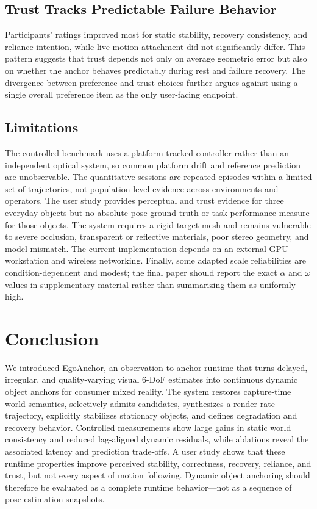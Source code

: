 \documentclass[review]{vgtc}
\newcommand{\system}{EgoAnchor}
\begin{document}
\subsection{Trust Tracks Predictable Failure Behavior}
Participants' ratings improved most for static stability, recovery consistency, and reliance intention, while live motion attachment did not significantly differ. This pattern suggests that trust depends not only on average geometric error but also on whether the anchor behaves predictably during rest and failure recovery. The divergence between preference and trust choices further argues against using a single overall preference item as the only user-facing endpoint.

\subsection{Limitations}
The controlled benchmark uses a platform-tracked controller rather than an independent optical system, so common platform drift and reference prediction are unobservable. The quantitative sessions are repeated episodes within a limited set of trajectories, not population-level evidence across environments and operators. The user study provides perceptual and trust evidence for three everyday objects but no absolute pose ground truth or task-performance measure for those objects. The system requires a rigid target mesh and remains vulnerable to severe occlusion, transparent or reflective materials, poor stereo geometry, and model mismatch. The current implementation depends on an external GPU workstation and wireless networking. Finally, some adapted scale reliabilities are condition-dependent and modest; the final paper should report the exact $\alpha$ and $\omega$ values in supplementary material rather than summarizing them as uniformly high.

\section{Conclusion}
We introduced \system, an observation-to-anchor runtime that turns delayed, irregular, and quality-varying visual 6-DoF estimates into continuous dynamic object anchors for consumer mixed reality. The system restores capture-time world semantics, selectively admits candidates, synthesizes a render-rate trajectory, explicitly stabilizes stationary objects, and defines degradation and recovery behavior. Controlled measurements show large gains in static world consistency and reduced lag-aligned dynamic residuals, while ablations reveal the associated latency and prediction trade-offs. A user study shows that these runtime properties improve perceived stability, correctness, recovery, reliance, and trust, but not every aspect of motion following. Dynamic object anchoring should therefore be evaluated as a complete runtime behavior---not as a sequence of pose-estimation snapshots.




\end{document}
